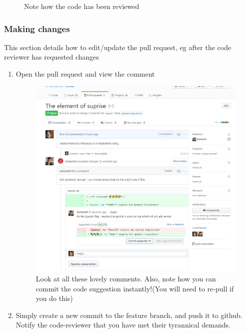 \documentclass[11pt, titlepage]{article}
\begin{document}
\begin{enumerate}
\begin{figure}[H]
		\caption{Note how the code has been reviewed}
	\end{figure}
\end{enumerate}

\subsubsection{Making changes}
\label{BPRW_RPW_making_changes}
This section details how to edit/update the pull request, eg after the code reviewer has requested changes
\begin{enumerate}
	\item Open the pull request and view the comment
	\begin{figure}[H]
		\centering
		\includegraphics[width=\textwidth]{BPRW/8view-comment}
		\caption{Look at all these lovely comments. Also, note how you can commit the code suggestion instantly!(You will need to re-pull if you do this)}
	\end{figure}
	\item Simply create a new commit to the feature branch, and push it to github. Notify the code-reviewer that you have met their tyrannical demands.
\end{enumerate}
\end{document}
